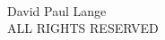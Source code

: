 \thispagestyle{plain}
\begin{center}
    \mbox{}
    \vfill
    \textcopyright {}\\
    David Paul Lange\\
    ALL RIGHTS RESERVED
\end{center}